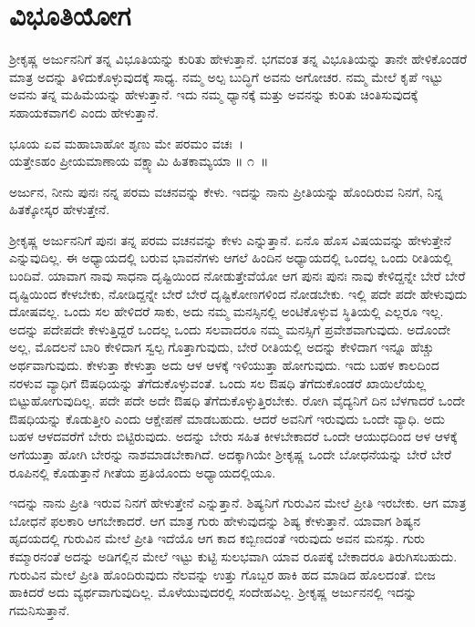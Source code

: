 
\chapter{ವಿಭೂತಿಯೋಗ}

ಶ‍್ರೀಕೃಷ್ಣ ಅರ್ಜುನನಿಗೆ ತನ್ನ ವಿಭೂತಿಯನ್ನು ಕುರಿತು ಹೇಳುತ್ತಾನೆ. ಭಗವಂತ ತನ್ನ ವಿಭೂತಿಯನ್ನು ತಾನೇ ಹೇಳಿಕೊಂಡರೆ ಮಾತ್ರ ಅದನ್ನು ತಿಳಿದುಕೊಳ್ಳುವುದಕ್ಕೆ ಸಾಧ್ಯ. ನಮ್ಮ ಅಲ್ಪ ಬುದ್ಧಿಗೆ ಅವನು ಅಗೋಚರ. ನಮ್ಮ ಮೇಲೆ ಕೃಪೆ ಇಟ್ಟು ಅವನು ತನ್ನ ಮಹಿಮೆಯನ್ನು ಹೇಳುತ್ತಾನೆ. ಇದು ನಮ್ಮ ಧ್ಯಾನಕ್ಕೆ ಮತ್ತು ಅವನನ್ನು ಕುರಿತು ಚಿಂತಿಸುವುದಕ್ಕೆ ಸಹಾಯಕವಾಗಲಿ ಎಂದು ಹೇಳುತ್ತಾನೆ.

\begin{shloka}
ಭೂಯ ಏವ ಮಹಾಬಾಹೋ ಶೃಣು ಮೇ ಪರಮಂ ವಚಃ~।\\ಯತ್ತೇಽಹಂ ಪ್ರೀಯಮಾಣಾಯ ವಕ್ಷ್ಯಾಮಿ ಹಿತಕಾಮ್ಯಯಾ \hfill॥ ೧~॥
\end{shloka}

\begin{artha}
ಅರ್ಜುನ, ನೀನು ಪುನಃ ನನ್ನ ಪರಮ ವಚನವನ್ನು ಕೇಳು. ಇದನ್ನು ನಾನು ಪ್ರೀತಿಯನ್ನು ಹೊಂದಿರುವ ನಿನಗೆ, ನಿನ್ನ ಹಿತಕ್ಕೋಸ್ಕರ ಹೇಳುತ್ತೇನೆ.
\end{artha}

ಶ‍್ರೀಕೃಷ್ಣ ಅರ್ಜುನನಿಗೆ ಪುನಃ ತನ್ನ ಪರಮ ವಚನವನ್ನು ಕೇಳು ಎನ್ನುತ್ತಾನೆ. ಏನೊ ಹೊಸ ವಿಷಯವನ್ನು ಹೇಳುತ್ತೇನೆ ಎನ್ನುವುದಿಲ್ಲ. ಈ ಅಧ್ಯಾಯದಲ್ಲಿ ಬರುವ ಭಾವನೆಗಳು ಆಗಲೆ ಹಿಂದಿನ ಅಧ್ಯಾಯದಲ್ಲಿ ಒಂದಲ್ಲ ಒಂದು ರೀತಿಯಲ್ಲಿ ಬಂದಿವೆ. ಯಾವಾಗ ನಾವು ಸಾಧನಾ ದೃಷ್ಟಿಯಿಂದ ನೋಡುತ್ತೇವೆಯೋ ಆಗ ಪುನಃ ಪುನಃ ನಾವು ಕೇಳಿದ್ದನ್ನೇ ಬೇರೆ ಬೇರೆ ದೃಷ್ಟಿಯಿಂದ ಕೇಳಬೇಕು, ನೋಡಿದ್ದನ್ನೇ ಬೇರೆ ಬೇರೆ ದೃಷ್ಟಿಕೋಣಗಳಿಂದ ನೋಡಬೇಕು. ಇಲ್ಲಿ ಪದೇ ಪದೇ ಹೇಳುವುದು ದೋಷವಲ್ಲ. ಒಂದು ಸಲ ಹೇಳಿದರೆ ಸಾಕು, ಅದು ನಮ್ಮ ಮನಸ್ಸಿನಲ್ಲಿ ಅಂಟಿಕೊಳ್ಳುವ ಸ್ಥಿತಿಯಲ್ಲಿ ಎಲ್ಲರೂ ಇಲ್ಲ. ಅದನ್ನು ಪದೇಪದೇ ಕೇಳುತ್ತಿದ್ದರೆ ಒಂದಲ್ಲ ಒಂದು ಸಲವಾದರೂ ನಮ್ಮ ಮನಸ್ಸಿಗೆ ಪ್ರವೇಶವಾಗುವುದು. ಅದೊಂದೇ ಅಲ್ಲ, ಮೊದಲನೆ ಬಾರಿ ಕೇಳಿದಾಗ ಸ್ವಲ್ಪ ಗೊತ್ತಾಗುವುದು, ಬೇರೆ ರೀತಿಯಲ್ಲಿ ಅದನ್ನು ಕೇಳಿದಾಗ ಇನ್ನೂ ಹೆಚ್ಚು ಅರ್ಥವಾಗುವುದು. ಕೇಳುತ್ತಾ ಕೇಳುತ್ತಾ ಅದು ಆಳ ಆಳಕ್ಕೆ ಇಳಿಯುತ್ತಾ ಹೋಗುವುದು. ಇದು ಬಹಳ ಕಾಲದಿಂದ ನರಳುವ ವ್ಯಾಧಿಗೆ ಔಷಧಿಯನ್ನು ತೆಗೆದುಕೊಳ್ಳುವಂತೆ. ಒಂದು ಸಲ ಔಷಧಿ ತೆಗೆದುಕೊಂಡರೆ ಖಾಯಿಲೆಯೆಲ್ಲ ಬಿಟ್ಟುಹೋಗುವುದಿಲ್ಲ. ಪದೇ ಪದೇ ಅದೇ ಔಷಧಿ ತೆಗೆದುಕೊಳ್ಳುತ್ತಿರಬೇಕು. ರೋಗಿ ವೈದ್ಯನಿಗೆ ದಿನ ಬೆಳಗಾದರೆ ಒಂದೇ ಔಷಧಿಯನ್ನು ಕೊಡುತ್ತೀರಿ ಎಂದು ಆಕ್ಷೇಪಣೆ ಮಾಡಬಹುದು. ಆದರೆ ಅವನಿಗೆ ಇರುವುದು ಒಂದೇ ವ್ಯಾಧಿ. ಅದು ಬಹಳ ಆಳದವರೆಗೆ ಬೇರು ಬಿಟ್ಟಿರುವುದು. ಅದನ್ನು ಬೇರು ಸಹಿತ ಕೀಳಬೇಕಾದರೆ ಒಂದೇ ಆಯುಧದಿಂದ ಆಳ ಆಳಕ್ಕೆ ಅಗೆಯುತ್ತಾ ಹೋಗಿ ಬೇರನ್ನು ನಾಶಮಾಡಬೇಕಾಗಿದೆ. ಅದಕ್ಕಾಗಿಯೇ ಶ‍್ರೀಕೃಷ್ಣ ಒಂದೇ ಬೋಧನೆಯನ್ನು ಬೇರೆ ಬೇರೆ ರೂಪಿನಲ್ಲಿ ಕೊಡುತ್ತಾನೆ ಗೀತೆಯ ಪ್ರತಿಯೊಂದು ಅಧ್ಯಾಯದಲ್ಲಿಯೂ.

\newpage

ಇದನ್ನು ನಾನು ಪ್ರೀತಿ ಇರುವ ನಿನಗೆ ಹೇಳುತ್ತೇನೆ ಎನ್ನುತ್ತಾನೆ. ಶಿಷ್ಯನಿಗೆ ಗುರುವಿನ ಮೇಲೆ ಪ್ರೀತಿ ಇರಬೇಕು. ಆಗ ಮಾತ್ರ ಬೋಧನೆ ಫಲಕಾರಿ ಆಗಬೇಕಾದರೆ. ಆಗ ಮಾತ್ರ ಗುರು ಹೇಳುವುದನ್ನು ಶಿಷ್ಯ ಕೇಳುತ್ತಾನೆ. ಯಾವಾಗ ಶಿಷ್ಯನ ಹೃದಯದಲ್ಲಿ ಗುರುವಿನ ಮೇಲೆ ಪ್ರೀತಿ ಇದೆಯೊ ಆಗ ಕಾದ ಕಬ್ಬಿಣದಂತೆ ಇರುವುದು ಅವನ ಮನಸ್ಸು. ಗುರು ಕಮ್ಮಾರನಂತೆ ಅದನ್ನು ಅಡಿಗಲ್ಲಿನ ಮೇಲೆ ಇಟ್ಟು ಕುಟ್ಟಿ ಸುಲಭವಾಗಿ ಯಾವ ರೂಪಕ್ಕೆ ಬೇಕಾದರೂ ತಿರುಗಿಸಬಹುದು. ಗುರುವಿನ ಮೇಲೆ ಪ್ರೀತಿ ಹೊಂದಿರುವುದು ನೆಲವನ್ನು ಉತ್ತು ಗೊಬ್ಬರ ಹಾಕಿ ಹದ ಮಾಡಿದ ಹೊಲದಂತೆ. ಬೀಜ ಹಾಕಿದರೆ ಅದು ವ್ಯರ್ಥವಾಗುವುದಿಲ್ಲ. ಮೊಳೆಯುವುದರಲ್ಲಿ ಸಂದೇಹವಿಲ್ಲ. ಶ‍್ರೀಕೃಷ್ಣ ಅರ್ಜುನನಲ್ಲಿ ಇದನ್ನು ಗಮನಿಸುತ್ತಾನೆ.


